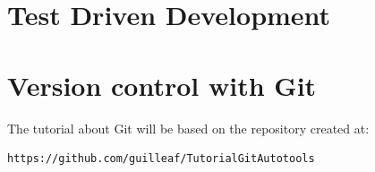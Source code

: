 \section{Test Driven Development}


\section{Version control with Git}

The tutorial about Git will be based on the repository created at:

\begin{lstlisting}
https://github.com/guilleaf/TutorialGitAutotools
\end{lstlisting}



